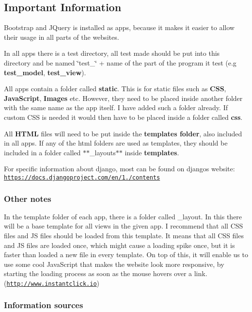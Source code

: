 \subsection*{Important Information }

Bootstrap and J\-Query is installed as apps, because it makes it easier to allow their usage in all parts of the websites.

In all apps there is a test directory, all test made should be put into this directory and be named \char`\"{}test\-\_\-\char`\"{} + name of the part of the program it test (e.\-g {\bfseries test\-\_\-model}, {\bfseries test\-\_\-view}).

All apps contain a folder called {\bfseries static}. This is for static files such as {\bfseries C\-S\-S}, {\bfseries Java\-Script}, {\bfseries Images} etc. However, they need to be placed inside another folder with the same name as the app itself. I have added such a folder already. If custom C\-S\-S is needed it would then have to be placed inside a folder called {\bfseries css}.

All {\bfseries H\-T\-M\-L} files will need to be put inside the {\bfseries templates folder}, also included in all apps. If any of the html folders are used as templates, they should be included in a folder called $\ast$$\ast$\-\_\-layouts$\ast$$\ast$ inside {\bfseries templates}.

For specific information about django, most can be found on djangos website\-: \href{https://docs.djangoproject.com/en/1.6/contents}{\tt https\-://docs.\-djangoproject.\-com/en/1./contents}

\subsubsection*{Other notes}

In the template folder of each app, there is a folder called \-\_\-layout. In this there will be a base template for all views in the given app. I recommend that all C\-S\-S files and J\-S files should be loaded from this template. It means that all C\-S\-S files and J\-S files are loaded once, which might cause a loading spike once, but it is faster than loaded a new file in every template. On top of this, it will enable us to use some cool Java\-Script that makes the website look more responsive, by starting the loading process as soon as the mouse hovers over a link. (\href{http://www.instantclick.io}{\tt http\-://www.\-instantclick.\-io})

\subsubsection*{Information sources}

